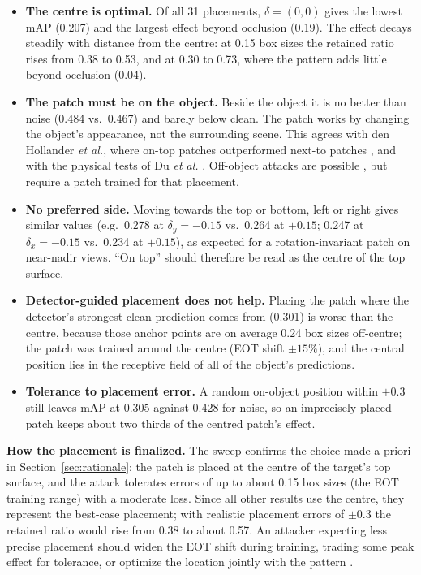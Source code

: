 \documentclass[conference]{IEEEtran}
\begin{document}
\begin{itemize}
\item \textbf{The centre is optimal.} Of all 31 placements, $\delta=(0,0)$ gives the lowest
mAP (0.207) and the largest effect beyond occlusion (0.19). The effect decays steadily with
distance from the centre: at 0.15 box sizes the retained ratio rises from 0.38 to 0.53, and at
0.30 to 0.73, where the pattern adds little beyond occlusion (0.04).
\item \textbf{The patch must be on the object.} Beside the object it is no better than
noise (0.484 vs.\ 0.467) and barely below clean. The patch works by changing the object's
appearance, not the surrounding scene. This agrees with den Hollander \emph{et al.}, where
on-top patches outperformed next-to patches \cite{denhollander2020adversarial}, and with the
physical tests of Du \emph{et al.} \cite{du2022physical}. Off-object attacks are possible
\cite{lian2022benchmarking}, but require a patch trained for that placement.
\item \textbf{No preferred side.} Moving towards the top or bottom, left or right gives
similar values (e.g.\ 0.278 at $\delta_y=-0.15$ vs.\ 0.264 at $+0.15$; 0.247 at
$\delta_x=-0.15$ vs.\ 0.234 at $+0.15$), as expected for a rotation-invariant patch on
near-nadir views. ``On top'' should therefore be read as the centre of the top surface.
\item \textbf{Detector-guided placement does not help.} Placing the patch where the
detector's strongest clean prediction comes from (0.301) is worse than the centre, because
those anchor points are on average 0.24 box sizes off-centre; the patch was trained around
the centre (EOT shift $\pm15\%$), and the central position lies in the receptive field of all
of the object's predictions.
\item \textbf{Tolerance to placement error.} A random on-object position within $\pm0.3$
still leaves mAP at 0.305 against 0.428 for noise, so an imprecisely placed patch keeps
about two thirds of the centred patch's effect.
\end{itemize}

\textbf{How the placement is finalized.} The sweep confirms the choice made a priori in
Section~\ref{sec:rationale}: the patch is placed at the centre of the target's top surface,
and the attack tolerates errors of up to about 0.15 box sizes (the EOT training range) with a
moderate loss. Since all other results use the centre, they represent the best-case
placement; with realistic placement errors of $\pm0.3$ the retained ratio would rise from
0.38 to about 0.57. An attacker expecting less precise placement should widen the EOT shift
during training, trading some peak effect for tolerance, or optimize the location jointly with
the pattern \cite{rao2020location}.
\end{document}
